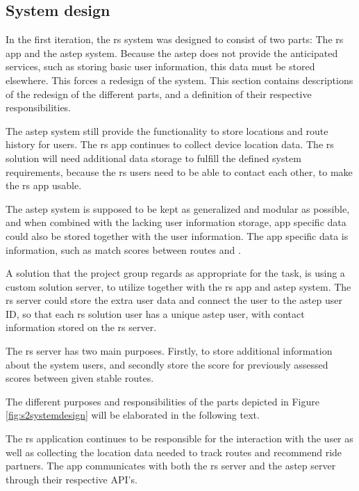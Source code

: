 \subsection{System design}
In the first iteration, the \gls{rs} system was designed to consist of two parts: The \gls{rs} app and the \gls{astep} system.
Because the \gls{astep} does not provide the anticipated services, such as storing basic user information, this data must be stored elsewhere.
This forces a redesign of the system.
This section contains descriptions of the redesign of the different parts, and a definition of their respective responsibilities.


The \gls{astep} system still provide the functionality to store locations and route history for users.
The \gls{rs} app continues to collect device location data.  
The \gls{rs} solution will need additional data storage to fulfill the defined system requirements, because the \gls{rs} users need to be able to contact each other, to make the \gls{rs} app usable.


The \gls{astep} system is supposed to be kept as generalized and modular as possible, and when combined with the lacking user information storage, app specific data could also be stored together with the user information.
The app specific data is information, such as match scores between routes and .


A solution that the project group regards as appropriate for the task, is using a custom solution server, to utilize together with the \gls{rs} app and \gls{astep} system.
The \gls{rs} server could store the extra user data and connect the user to the \gls{astep} user ID, so that each \gls{rs} solution user has a unique \gls{astep} user, with contact information stored on the \gls{rs} server.


The \gls{rs} server has two main purposes.
Firstly, to store additional information about the system users, and secondly store the score for previously assessed scores between given stable routes.


The different purposes and responsibilities of the parts depicted in Figure \ref{fig:s2systemdesign} will be elaborated in the following text.


The \gls{rs} application continues to be responsible for the interaction with the user as well as collecting the location data needed to track routes and recommend ride partners.
The app communicates with both the \gls{rs} server and the \gls{astep} server through their respective API's.


